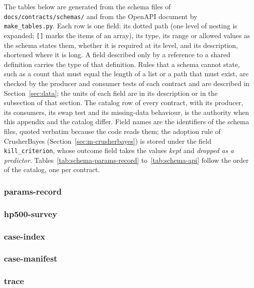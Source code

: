 The tables below are generated from the schema files of \texttt{docs/\allowbreak{}contracts/\allowbreak{}schemas/\allowbreak{}} and from the OpenAPI document by \texttt{make\_tables.py}. Each
row is one field: its dotted path (one level of nesting is expanded; \texttt{[]} marks the items of an array), its type, its range or allowed values as the
schema states them, whether it is required at its level, and its description, shortened where it is long. A field described only by a reference to a
shared definition carries the type of that definition. Rules that a schema cannot state, such as a count that must equal the length of a list or a path that
must exist, are checked by the producer and consumer tests of each contract and are described in Section~\ref{sec:data}; the units of each field are in its
description or in the subsection of that section. The catalog row of every contract, with its producer, its consumers, its swap test and its missing-data
behaviour, is the authority when this appendix and the catalog differ. Field names are the identifiers of the schema files, quoted verbatim
because the code reads them; the adoption rule of CrusherBayes (Section~\ref{sec:m-crusherbayes}) is stored under the field
\texttt{kill\_criterion}, whose outcome field takes the values \emph{kept} and \emph{dropped as a predictor}. Tables~\ref{tab:schema-params-record}
to~\ref{tab:schema-api} follow the order of the catalog, one per contract.

\subsubsection*{params-record}

\subsubsection*{hp500-survey}

\subsubsection*{case-index}

\subsubsection*{case-manifest}

\subsubsection*{trace}

